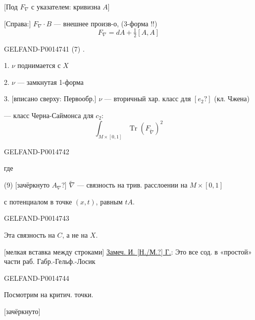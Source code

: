 [Под \(F_\nabla\) с указателем: кривизна \(A\)]

[Справа:] \(F_\nabla\cdot B\) — внешнее произв-о, (3-форма !!)
\begin{equation*}
F_\nabla=dA+\tfrac12[A,A]
\tag{6}
\end{equation*}


\begin{GelfandAdjacentEvidence}{GELFAND-P001474}{1}
(7) .

1. \(\nu\) поднимается с \(X\)

2. \(\nu\) — замкнутая 1-форма

3. [вписано сверху: Первообр.] \(\nu\) — вторичный хар. класс для \([e_2?]\) (кл. Чжена)

— класс Черна-Саймонса для \(c_2\):
\begin{equation*}
\int_{M\times[0,1]}\operatorname{Tr}(F_{\widetilde{\nabla}})^2
\tag{8}
\end{equation*}
\end{GelfandAdjacentEvidence}
\begin{GelfandAdjacentEvidence}{GELFAND-P001474}{2}


где

(9) [зачёркнуто \(A_\nabla\)?] \(\widetilde{\nabla}\) — связность на трив. расслоении на \(M\times[0,1]\)

с потенциалом в точке \((x,t)\), равным \(tA\).

\end{GelfandAdjacentEvidence}
\begin{GelfandAdjacentEvidence}{GELFAND-P001474}{3}


Эта связность на \(C\), а не на \(X\).

[мелкая вставка между строками] \underline{Замеч. И. [Н./М.?] Г.}: Это все сод. в «простой» части раб. Габр.-Гельф.-Лосик
\end{GelfandAdjacentEvidence}
\begin{GelfandAdjacentEvidence}{GELFAND-P001474}{4}


Посмотрим на критич. точки.

[зачёркнуто]
\end{GelfandAdjacentEvidence}
